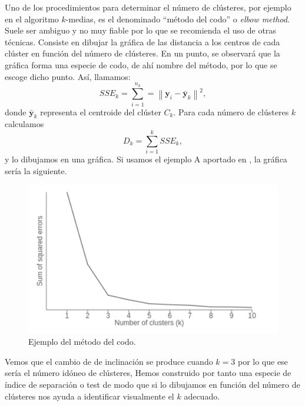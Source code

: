 \documentclass[a4paper, 20pt]{article}
\newcommand{\norm}[1]{\left\lVert#1\right\rVert}
\newcommand{\yy}{\textbf{y}}
\begin{document}
Uno de los procedimientos para determinar el número de clústeres, por ejemplo en el algoritmo $ k$-medias, es el denominado ``método del codo'' o \textit{elbow method}. Suele ser ambiguo y no muy fiable por lo que se recomienda el uso de otras técnicas. Consiste en dibujar la gráfica de las distancia a los centros de cada clúster en función del número de clústeres. En un punto, se observará que la gráfica forma una especie de codo, de ahí nombre del método, por lo que se escoge dicho punto. Así, llamamos:\\
\[
SSE_k = \sum_{i = 1}^{n_k} = \norm{\yy_i - \bar{\yy}_k}^2,
\]
donde $ \bar{\yy}_k $ representa el centroide del clúster $ C_k $. Para cada número de clústeres $ k $ calculamos 
\[
D_k = \sum_{i = 1} ^ {k} SSE_k,
\]
y lo dibujamos en una gráfica. Si usamos el ejemplo A aportado en \cite{elbowGraph}, la gráfica sería la siguiente.

\begin{figure}[h]
	\centering
	\includegraphics[scale=0.6]{pedro/elbowGraph}
	\caption{Ejemplo del método del codo.}
	\label{smkm}
\end{figure}

Vemos que el cambio de de inclinación se produce cuando $ k=3 $ por lo que ese sería el número idóneo de clústeres, Hemos construido por tanto una especie de índice de separación o test de modo que si lo dibujamos en función del número de clústeres nos ayuda a identificar visualmente el $ k $ adecuado. \\
\end{document}
